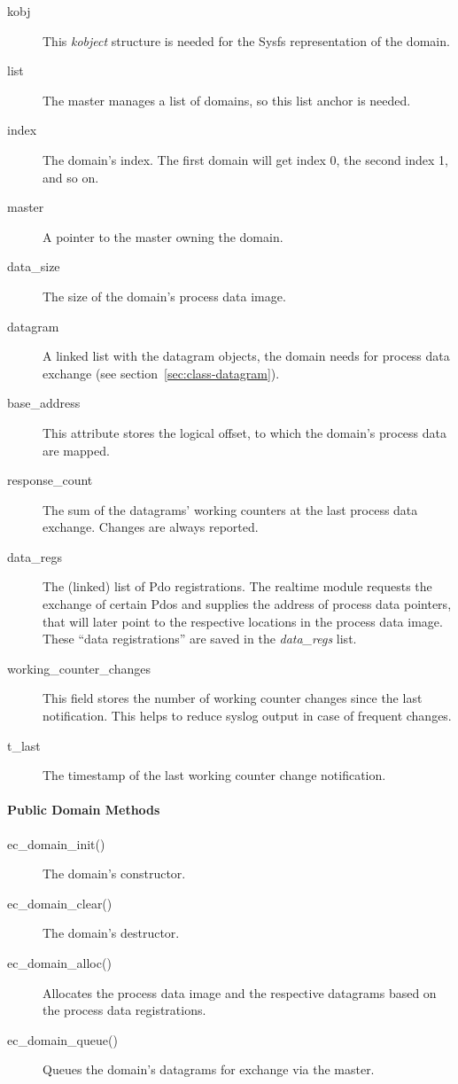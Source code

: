 \documentclass[a4paper,12pt,BCOR6mm,bibtotoc,idxtotoc]{scrbook}
\begin{document}
\begin{description}
\item[kobj] This \textit{kobject} structure is needed for the Sysfs
  representation of the domain.
\item[list] The master manages a list of domains, so this list anchor
  is needed.
\item[index] The domain's index. The first domain will get index 0,
  the second index 1, and so on.
\item[master] A pointer to the master owning the domain.
\item[data\_size] The size of the domain's process data image.
\item[datagram] A linked list with the datagram objects, the domain
  needs for process data exchange (see
  section~\ref{sec:class-datagram}).
\item[base\_address] This attribute stores the logical offset, to
  which the domain's process data are mapped.
\item[response\_count] The sum of the datagrams' working counters at
  the last process data exchange. Changes are always reported.
\item[data\_regs] The (linked) list of Pdo registrations. The realtime
  module requests the exchange of certain Pdos and supplies the
  address of process data pointers, that will later point to the
  respective locations in the process data image. These ``data
  registrations'' are saved in the \textit{data\_regs} list.
\item[working\_counter\_changes] This field stores the number of
  working counter changes since the last notification. This helps to
  reduce syslog output in case of frequent changes.
\item[t\_last] The timestamp of the last working counter change
  notification.
\end{description}

\paragraph{Public Domain Methods}

\begin{description}
\item[ec\_domain\_init()] The domain's constructor.
\item[ec\_domain\_clear()] The domain's destructor.
\item[ec\_domain\_alloc()] Allocates the process data image and the
  respective datagrams based on the process data registrations.
\item[ec\_domain\_queue()] Queues the domain's datagrams for exchange
  via the master.
\end{description}
\end{document}
